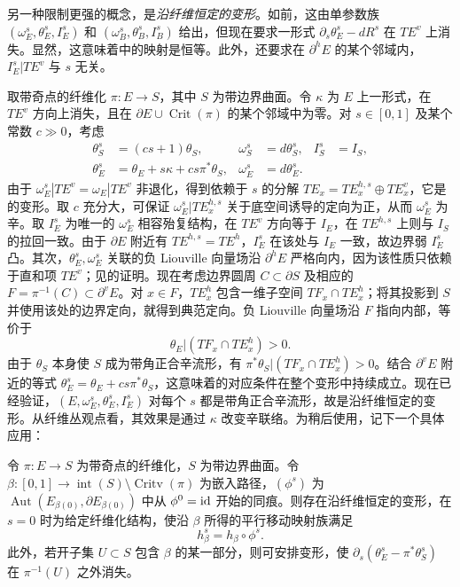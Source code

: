 另一种限制更强的概念，是\emph{沿纤维恒定的变形}。如前，这由单参数族 $(\omega_E^s,\theta_E^s,I_E^s)$ 和 $(\omega_B^s,\theta_B^s,I_B^s)$ 给出，但现在要求一形式 $\partial_s\theta_E^s-dR^s$ 在 $TE^v$ 上消失。显然，这意味着中的映射是恒等。此外，还要求在 $\partial^hE$ 的某个邻域内，$I_E^s|TE^v$ 与 $s$ 无关。

取带奇点的纤维化 $\pi:E\to S$，其中 $S$ 为带边界曲面。令 $\kappa$ 为 $E$ 上一形式，在 $TE^v$ 方向上消失，且在 $\partial E\cup\operatorname{Crit}(\pi)$ 的某个邻域中为零。对 $s\in[0,1]$ 及某个常数 $c\gg0$，考虑
\begin{equation}\label{eq:15.6}
\begin{aligned}
\theta_S^s&=(cs+1)\theta_S,&\omega_S^s&=d\theta_S^s,& I_S^s&=I_S,\\
\theta_E^s&=\theta_E+s\kappa+cs\pi^*\theta_S,&\omega_E^s&=d\theta_E^s.
\end{aligned}
\end{equation}
由于 $\omega_E^s|TE^v=\omega_E|TE^v$ 非退化，得到依赖于 $s$ 的分解 $TE_x=TE_x^{h,s}\oplus TE_x^v$，它是的变形。取 $c$ 充分大，可保证 $\omega_E^s|TE_x^{h,s}$ 关于底空间诱导的定向为正，从而 $\omega_E^s$ 为辛。取 $I_E^s$ 为唯一的 $\omega_E^s$ 相容殆复结构，在 $TE^v$ 方向等于 $I_E$，在 $TE^{h,s}$ 上则与 $I_S$ 的拉回一致。由于 $\partial E$ 附近有 $TE^{h,s}=TE^h$，$I_E^s$ 在该处与 $I_E$ 一致，故边界弱 $I_E^s$ 凸。其次，$\theta_E^s,\omega_E^s$ 关联的负 Liouville 向量场沿 $\partial^hE$ 严格向内，因为该性质只依赖于直和项 $TE^v$；见的证明。现在考虑边界圆周 $C\subset\partial S$ 及相应的 $F=\pi^{-1}(C)\subset\partial^vE$。对 $x\in F$，$TE_x^h$ 包含一维子空间 $TF_x\cap TE_x^h$；将其投影到 $S$ 并使用该处的边界定向，就得到典范定向。负 Liouville 向量场沿 $F$ 指向内部，等价于
\begin{equation}\label{eq:15.7}
\theta_E|(TF_x\cap TE_x^h)>0.
\end{equation}
由于 $\theta_S$ 本身使 $S$ 成为带角正合辛流形，有 $\pi^*\theta_S|(TF_x\cap TE_x^h)>0$。结合 $\partial^vE$ 附近的等式 $\theta_E^s=\theta_E+cs\pi^*\theta_S$，这意味着的对应条件在整个变形中持续成立。现在已经验证，$(E,\omega_E^s,\theta_E^s,I_E^s)$ 对每个 $s$ 都是带角正合辛流形，故是沿纤维恒定的变形。从纤维丛观点看，其效果是通过 $\kappa$ 改变辛联络。为稍后使用，记下一个具体应用：

\begin{lemma}\label{st:15.3}
令 $\pi:E\to S$ 为带奇点的纤维化，$S$ 为带边界曲面。令 $\beta:[0,1]\to\operatorname{int}(S)\setminus\operatorname{Critv}(\pi)$ 为嵌入路径，$(\phi^s)$ 为 $\operatorname{Aut}(E_{\beta(0)},\partial E_{\beta(0)})$ 中从 $\phi^0=\operatorname{id}$ 开始的同痕。则存在沿纤维恒定的变形，在 $s=0$ 时为给定纤维化结构，使沿 $\beta$ 所得的平行移动映射族满足
\[
h_\beta^s=h_\beta\circ\phi^s.
\]
此外，若开子集 $U\subset S$ 包含 $\beta$ 的某一部分，则可安排变形，使 $\partial_s(\theta_E^s-\pi^*\theta_S^s)$ 在 $\pi^{-1}(U)$ 之外消失。
\end{lemma}
